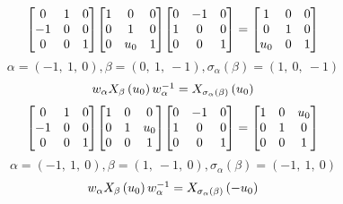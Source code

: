 \documentclass[11pt]{article}
\theoremstyle{definition}
\begin{document}
\[
\scaletoalign{\textwidth}{{\left[\begin{matrix}0 & 1 & 0\\-1 & 0 & 0\\0 & 0 & 1\end{matrix}\right]} {\left[\begin{matrix}1 & 0 & 0\\0 & 1 & 0\\0 & u_{0} & 1\end{matrix}\right]} {\left[\begin{matrix}0 & -1 & 0\\1 & 0 & 0\\0 & 0 & 1\end{matrix}\right]} = {\left[\begin{matrix}1 & 0 & 0\\0 & 1 & 0\\u_{0} & 0 & 1\end{matrix}\right]}}
\]
\[
\alpha = \left( -1, \  1, \  0\right), \beta = \left( 0, \  1, \  -1\right), \sigma_{\alpha}(\beta) = \left( 1, \  0, \  -1\right)
\]
\[
\scaletoalign{\textwidth}{w_{\alpha} X_{\beta}\left(u_{0}\right) w_{\alpha}^{-1} = X_{\sigma_{\alpha}\left(\beta\right)}\left(u_{0}\right)}
\]
\[
\scaletoalign{\textwidth}{{\left[\begin{matrix}0 & 1 & 0\\-1 & 0 & 0\\0 & 0 & 1\end{matrix}\right]} {\left[\begin{matrix}1 & 0 & 0\\0 & 1 & u_{0}\\0 & 0 & 1\end{matrix}\right]} {\left[\begin{matrix}0 & -1 & 0\\1 & 0 & 0\\0 & 0 & 1\end{matrix}\right]} = {\left[\begin{matrix}1 & 0 & u_{0}\\0 & 1 & 0\\0 & 0 & 1\end{matrix}\right]}}
\]
\[
\alpha = \left( -1, \  1, \  0\right), \beta = \left( 1, \  -1, \  0\right), \sigma_{\alpha}(\beta) = \left( -1, \  1, \  0\right)
\]
\[
\scaletoalign{\textwidth}{w_{\alpha} X_{\beta}\left(u_{0}\right) w_{\alpha}^{-1} = X_{\sigma_{\alpha}\left(\beta\right)}\left(- u_{0}\right)}
\]
\end{document}
